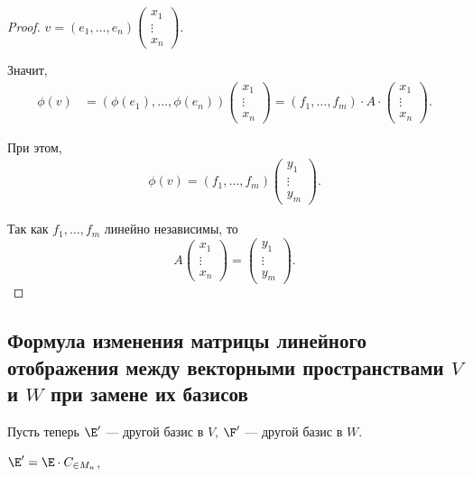 \begin{proof}
    $v = (e_1, \dots, e_n) \begin{pmatrix} x_1 \\ \vdots \\ x_n \end{pmatrix}$.

    Значит, 
    \begin{align*}
        \phi(v) &= (\phi(e_1), \dots, \phi(e_n)) \begin{pmatrix} x_1 \\ \vdots \\ x_n \end{pmatrix} = (f_1, \dots, f_m) \cdot A \cdot \begin{pmatrix} x_1 \\ \vdots \\ x_n \end{pmatrix}
    .\end{align*}

    При этом, 
    \begin{align*}
        \phi(v) = (f_1, \dots, f_m) \begin{pmatrix} y_1 \\ \vdots \\ y_m \end{pmatrix}
    .\end{align*}

    Так как $f_1, \dots, f_m$ линейно независимы, то
    \begin{equation*}
        A \begin{pmatrix} x_1 \\ \vdots \\ x_n \end{pmatrix} = \begin{pmatrix} y_1 \\ \vdots \\ y_m \end{pmatrix}
    .\end{equation*}
\end{proof}


\subsection{Формула изменения матрицы линейного отображения между векторными пространствами $V$ и $W$ при замене их базисов}

Пусть теперь $\E'$ --- другой базис в $V$, $\F'$ --- другой базис в $W$.

$\E' = \E \cdot C_{\in M_n}$,

